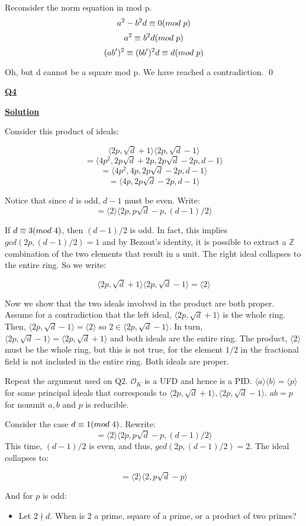 \documentclass{article}
\newcommand{\new}[1]{
    \vspace{2mm}
    \noindent
    \textbf{
    \underline{#1}}
}
\def\ZZ{{\mathbb{Z}}}
\def\_{{\hspace{1mm}}}
\newcommand{\<}{{
    \langle
}}
\def\>{{
    \rangle
}}
\def\ZZ{{\mathbb{Z}}}
\newcommand{\ringInt}{
    {\mathcal{O}}
}
\begin{document}
Reconsider the norm equation in mod p. 
\[
    a^2 - b^2d \equiv 0 (mod\_p)
\]
\[
    a^2 \equiv b^2d (mod\_p)
\]
\[
    (ab')^2 \equiv (bb')^2d \equiv d (mod\_p)
\]

Oh, but d cannot be a square mod p. We have reached a contradiction.
\qed

\newpage
\new{Q4}

\new{Solution}

Consider this product of ideals:

\[
    \<2p, \sqrt{d}+1\>\<2p, \sqrt{d} - 1\>\]\[
    =\<4p^2, 2p\sqrt{d}+2p, 2p\sqrt{d} - 2p, d-1\>
\]
\[
    = \<4p^2, 4p, 2p\sqrt{d}-2p, d-1\>
\]
\[
    = \<4p, 2p\sqrt{d}-2p, d-1\>
\]

Notice that since $d$ is odd, $d-1$ must be even. Write:
\[
    = \<2\>\<2p, p\sqrt{d}-p, (d-1)/2\>
\]

If $d \equiv 3 (mod\_4)$, then $(d-1)/2$ is odd. In fact, this implies 
$gcd(2p, (d-1)/2) = 1$ and by Bezout's identity, it is possible to 
extract a $\ZZ$ combination of the two elements that result in a unit.
The right ideal collapses to the entire ring. So we write:

\[
    \<2p, \sqrt{d}+1\>\<2p, \sqrt{d} - 1\> = \<2\>
\]

Now we show that the two ideals involved in the product are both proper. 
Assume for a contradiction that the left ideal, 
$\<2p, \sqrt{d}+1\>$ is the whole ring. Then, 
$\<2p, \sqrt{d} - 1\> = \<2\>$ so $2 \in \<2p, \sqrt{d} - 1\>$. 
In turn, $\<2p, \sqrt{d} - 1\> = \<2p, \sqrt{d} + 1\>$ and both ideals 
are the entire ring. The product, $\<2\>$ must be the whole ring, 
but this is not true, for the element $1/2$ in the fractional field
is not included in the entire ring. Both ideals are proper.

Repeat the argument used on Q2. $\ringInt_K$ is a UFD and hence is a 
PID. $\<a\>\<b\> = \<p\>$ for some principal ideals that corresponds to 
$\<2p, \sqrt{d}+1\>, \<2p, \sqrt{d} - 1\>$. $ab = p$ for nonunit 
$a, b$ and $p$ is reducible. 

Consider the case $d \equiv 1(mod\_4)$. Rewrite:
\[
    = \<2\>\<2p, p\sqrt{d}-p, (d-1)/2\>
\]
This time, $(d-1)/2$ is even, and thus, $gcd(2p, (d-1)/2) = 2$. 
The ideal collapses to:

\[
     =
    \<2\>\<2, p\sqrt{d}-p\>
\]

And for $p$ is odd:
\[
    \]

\newpage
\begin{itemize}
    \item Let $2 \nmid d$. When is 2 a prime, square of a prime, or a product of two primes?
\end{itemize}
\end{document}
